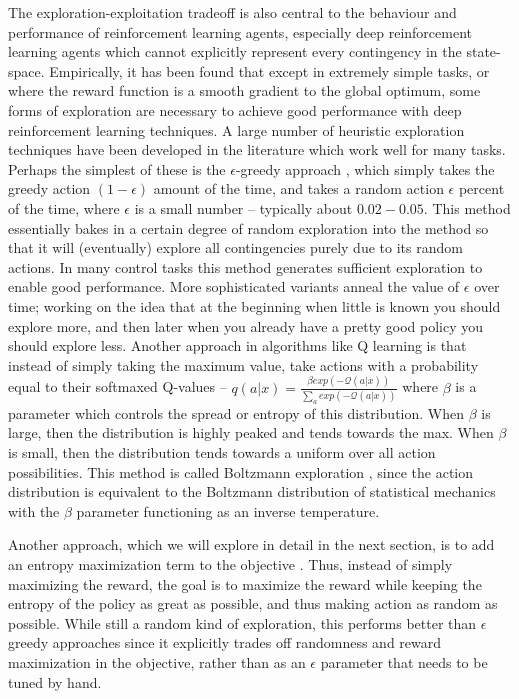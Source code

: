 The exploration-exploitation tradeoff is also central to the behaviour and performance of reinforcement learning agents, especially deep reinforcement learning agents which cannot explicitly represent every contingency in the state-space. Empirically, it has been found that except in extremely simple tasks, or where the reward function is a smooth gradient to the global optimum, some forms of exploration are necessary to achieve good performance with deep reinforcement learning techniques. A large number of heuristic exploration techniques have been developed in the literature which work well for many tasks. Perhaps the simplest of these is the $\epsilon$-greedy approach \citep{sutton1998introduction}, which simply takes the greedy action $(1 - \epsilon)$ amount of the time, and takes a random action $\epsilon$ percent of the time, where $\epsilon$ is a small number -- typically about $0.02-0.05$. This method essentially bakes in a certain degree of random exploration into the method so that it will (eventually) explore all contingencies purely due to its random actions. In many control tasks this method generates sufficient exploration to enable good performance. More sophisticated variants anneal the value of $\epsilon$ over time; working on the idea that at the beginning when little is known you should explore more, and then later when you already have a pretty good policy you should explore less. Another approach in algorithms like Q learning is that instead of simply taking the maximum value, take actions with a probability equal to their softmaxed Q-values -- $q(a | x) = \frac{\beta exp(-\mathcal{Q}(a | x))}{\sum_a exp(-\mathcal{Q}(a | x))}$ where $\beta$ is a parameter which controls the spread or entropy of this distribution. When $\beta$ is large, then the distribution is highly peaked and tends towards the max. When $\beta$ is small, then the distribution tends towards a uniform over all action possibilities. This method is called Boltzmann exploration \citep{cesa2017boltzmann}, since the action distribution is equivalent to the Boltzmann distribution of statistical mechanics with the $\beta$ parameter functioning as an inverse temperature.

Another approach, which we will explore in detail in the next section, is to add an entropy maximization term to the objective \citep{levine2018reinforcement}. Thus, instead of simply maximizing the reward, the goal is to maximize the reward while keeping the entropy of the policy as great as possible, and thus making action as random as possible. While still a random kind of exploration, this performs better than $\epsilon$ greedy approaches since it explicitly trades off randomness and reward maximization in the objective, rather than as an $\epsilon$ parameter that needs to be tuned by hand.

